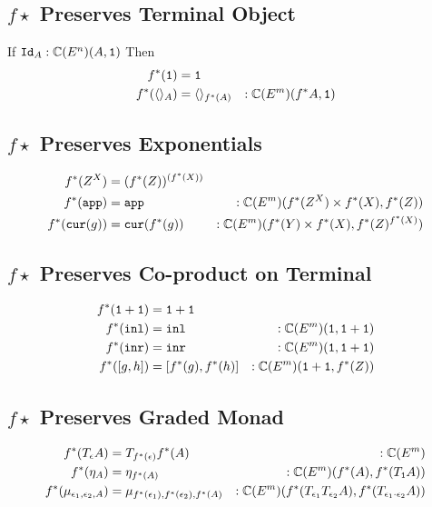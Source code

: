 \subsection{$f\star$ Preserves Terminal Object}
If $\texttt{Id}_{A}:\mathbb{C}(E^n)(A, \texttt{1})$
Then 
\begin{align*}
    f^*(\texttt{1}) & = \texttt{1} \\
    f^*(\langle\rangle_{A}) & = \langle\rangle_{f^*(A)}&:\mathbb{C}(E^m)(f^* A, \texttt{1})\\
\end{align*}

\subsection{$f\star$ Preserves Exponentials}
\begin{align*}
    f^*(Z^X) & = (f^*(Z))^{(f^*(X))}\\
     f^*(\texttt{app}) &= \texttt{app}&:\mathbb{C}(E^m)(f^*(Z^X)\times f^*(X), f^*(Z))\\
     f^*(\texttt{cur}(g)) &= \texttt{cur}(f^*(g))&:\mathbb{C}(E^m)(f^*(Y)\times f^*(X), f^*(Z)^{f^*(X)})
\end{align*}

\subsection{$f\star$ Preserves Co-product on Terminal}

\begin{align*}
    f^*(\texttt{1}+\texttt{1}) &= \texttt{1}+\texttt{1}\\
    f^*(\texttt{inl})  &= \texttt{inl}&:\mathbb{C}(E^m)(\texttt{1}, \texttt{1}+\texttt{1}) \\
    f^*(\texttt{inr}) &= \texttt{inr}&:\mathbb{C}(E^m)(\texttt{1}, \texttt{1}+\texttt{1}) \\
    f^*([g, h]) &= [f^*(g), f^*(h)]&:\mathbb{C}(E^m)(\texttt{1}+\texttt{1}, f^*(Z))
\end{align*}

\subsection{$f\star$ Preserves Graded Monad}
\begin{align*}
    f^*(T_{\epsilon}{A}) &= T_{f^*(\epsilon)}{f^*(A)}&:\mathbb{C}(E^m)\\    
    f^*(\eta_{A}) &= \eta_{f^*(A)}&:\mathbb{C}(E^m)(f^*(A), f^*(T_{\texttt{1}}{A}))\\
    f^*(\mu_{\epsilon_1, \epsilon_2, A}) &= \mu_{f^*(\epsilon_1), f^*(\epsilon_2), f^*(A)}&:\mathbb{C}(E^m)(f^*(T_{\epsilon_1}{T_{\epsilon_2}{A}}), f^*(T_{\epsilon_1\cdot\epsilon_2}{A}))\\
\end{align*}

